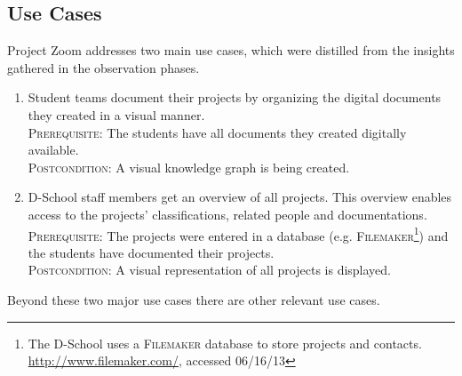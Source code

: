 \subsection{Use Cases}
Project Zoom addresses two main use cases, which were distilled from the insights gathered in the observation phases.

\begin{enumerate}
\item Student teams document their projects by organizing the digital documents they created in a visual manner.\\
\textsc{Prerequisite}: The students have all documents they created digitally available.\\
\textsc{Postcondition}: A visual knowledge graph is being created. \label{uc:organize}

\item D-School staff members get an overview of all projects. This overview enables access to the projects' classifications, related people and documentations.\\
\textsc{Prerequisite}: The projects were entered in a database (e.g. \textsc{Filemaker}\footnote{The D-School uses a \textsc{Filemaker} database to store projects and contacts. \url{http://www.filemaker.com/}, accessed 06/16/13}) and the students have documented their projects.\\
\textsc{Postcondition}: A visual representation of all projects is displayed. \label{uc:display}
\end{enumerate}

Beyond these two major use cases there are other relevant use cases.

